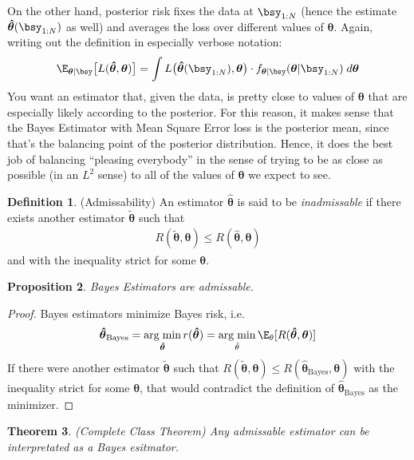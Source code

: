 \documentclass[12pt]{article}
\theoremstyle{plain}
\newtheorem{thm}{Theorem}[section]
\newtheorem{prop}[thm]{Proposition}
\theoremstyle{definition}
\newtheorem{defn}[thm]{Definition}
\theoremstyle{remark}
\newcommand{\bstheta}{\boldsymbol{\theta}}
\newcommand{\bshattheta}{\boldsymbol{\hat{\theta}}}
\newcommand{\bstildetheta}{\boldsymbol{\tilde{\theta}}}
\DeclareMathOperator*{\argmin}{arg\;min}
\begin{document}
On the other hand, posterior risk fixes the data at $\bsy_{1:N}$ (hence
the estimate $\bshattheta(\bsy_{1:N})$ as well) and averages the loss
over different values of $\bstheta$.
Again, writing out the definition in especially verbose notation:
\begin{align*}
  \E_{\bstheta|\bsy}\big[
    L(\bshattheta,\bstheta)
  \big] =
  \int L\big(\bshattheta(\bsy_{1:N}),\bstheta\big)
    \cdot f_{\bstheta|\bsy}(\bstheta|\bsy_{1:N})\; d\bstheta
\end{align*}
You want an estimator that, given the data, is pretty close to values of
$\bstheta$ that are especially likely according to the posterior.  For
this reason, it makes sense that the Bayes Estimator with Mean Square
Error loss is the posterior mean, since that's the balancing point of
the posterior distribution. Hence, it does the best job of balancing
``pleasing everybody'' in the sense of trying to be as close as possible
(in an $L^2$ sense) to all of the values of $\bstheta$ we expect to see.

\begin{defn}(Admissability)
An estimator $\bshattheta$ is said to be \emph{inadmissable} if there
exists another estimator $\bstildetheta$ such that
\begin{align*}
  R(\bstildetheta,\bstheta)
  \leq
  R(\bshattheta,\bstheta)
\end{align*}
and with the inequality strict for some $\bstheta$.
\end{defn}

\begin{prop}
Bayes Estimators are admissable.
\end{prop}
\begin{proof}
Bayes estimators minimize Bayes risk, i.e.
\begin{align*}
  \bshattheta_\text{Bayes}
  = \argmin_{\bshattheta} r(\bshattheta)
  = \argmin_{\hat{\theta}}\E_\theta[R(\bshattheta,\bstheta)]
\end{align*}
If there were another estimator $\bstildetheta$ such that
$R(\bstildetheta,\bstheta)\leq R(\bshattheta_\text{Bayes},\bstheta)$
with the inequality strict for some $\bstheta$, that would contradict
the definition of $\bshattheta_\text{Bayes}$ as the minimizer.
\end{proof}

\begin{thm}\emph{(Complete Class Theorem)}
Any admissable estimator can be interpretated as a Bayes esitmator.
\end{thm}
\end{document}
